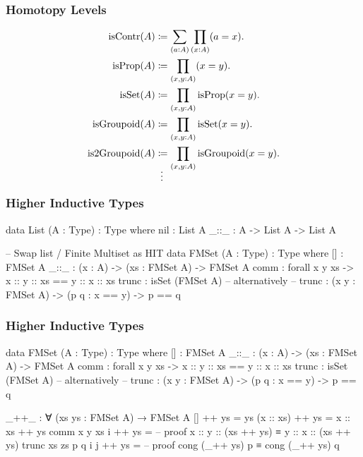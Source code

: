 \documentclass{beamer}
\begin{document}
\begin{frame}
\frametitle{Homotopy Levels}

\begin{align*}
  \text{isContr}(A) & \coloneqq \sum_{(a:A)} \prod_{(x:A)} (a = x).
  \\
  \text{isProp}(A) & \coloneqq \prod_{(x,y:A)} (x = y).
  \\
  \text{isSet}(A) & \coloneqq \prod_{(x,y:A)} \text{isProp}(x = y).
  \\
  \text{isGroupoid}(A) & \coloneqq \prod_{(x,y:A)} \text{isSet}(x = y).
  \\
  \text{is2Groupoid}(A) & \coloneqq \prod_{(x,y:A)} \text{isGroupoid}(x = y).
  \\
  \shortvdotswithin{=}
\end{align*}

\end{frame}


\begin{frame}[fragile]
\frametitle{Higher Inductive Types}

\begin{code}
data List (A : Type) : Type where
  nil : List A
  _::_ : A -> List A -> List A

-- Swap list / Finite Multiset as HIT
data FMSet (A : Type) : Type where
  []    : FMSet A
  _::_  : (x : A) -> (xs : FMSet A) -> FMSet A
  comm  : forall x y xs -> x :: y :: xs == y :: x :: xs
  trunc : isSet (FMSet A)
  -- alternatively
  -- trunc : (x y : FMSet A) -> (p q : x == y) -> p == q
\end{code}

\end{frame}

\begin{frame}[fragile]
\frametitle{Higher Inductive Types}

\begin{code}
data FMSet (A : Type) : Type where
  []    : FMSet A
  _::_  : (x : A) -> (xs : FMSet A) -> FMSet A
  comm  : forall x y xs -> x :: y :: xs == y :: x :: xs
  trunc : isSet (FMSet A)
  -- alternatively
  -- trunc : (x y : FMSet A) -> (p q : x == y) -> p == q

_++_ : ∀ (xs ys : FMSet A) → FMSet A
[] ++ ys = ys
(x :: xs) ++ ys = x :: xs ++ ys
comm x y xs i ++ ys =
  -- proof x :: y :: (xs ++ ys) ≡ y :: x :: (xs ++ ys)
trunc xs zs p q i j ++ ys =
  -- proof cong (_++ ys) p ≡ cong (_++ ys) q
\end{code}

\end{frame}
\end{document}
